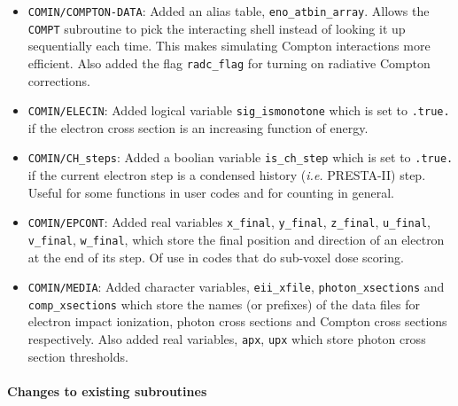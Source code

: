 \begin{itemize}

\item
{}
{\tt COMIN/COMPTON-DATA}: Added an alias table,
{\tt eno\_atbin\_array}.  Allows the {\tt COMPT} subroutine to pick the
interacting shell instead of looking it up sequentially each time.  This
makes simulating Compton interactions more efficient.  Also added the
flag {\tt radc\_flag} for turning on radiative Compton corrections.

\item {\tt COMIN/ELECIN}: Added logical variable
{\tt sig\_ismonotone} which is set to {\tt .true.} if the electron
cross section is an increasing function of energy.

\item
{}
{\tt COMIN/CH\_steps}: Added a boolian variable {\tt is\_ch\_step} which
is set to {\tt .true.} if the current electron step is a condensed
history ({\em i.e.} PRESTA-II) step.  Useful for some functions in
user codes and for counting in general.

\item
{}
{\tt COMIN/EPCONT}: Added real variables {\tt x\_final}, {\tt y\_final}, {\tt z\_final},
{\tt u\_final}, {\tt v\_final}, {\tt w\_final}, which store the final
position and direction of an electron at the end of its step.  Of use
in codes that do sub-voxel dose scoring.

\item
{}
{\tt COMIN/MEDIA}: Added character variables, {\tt eii\_xfile},
{\tt photon\_xsections} and {\tt comp\_xsections} which store the names
(or prefixes) of the data files for electron impact ionization, photon
cross sections and Compton cross sections respectively.  Also added
real variables, {\tt apx}, {\tt upx} which store photon cross section
thresholds.

\end{itemize}

\paragraph{Changes to existing subroutines}

